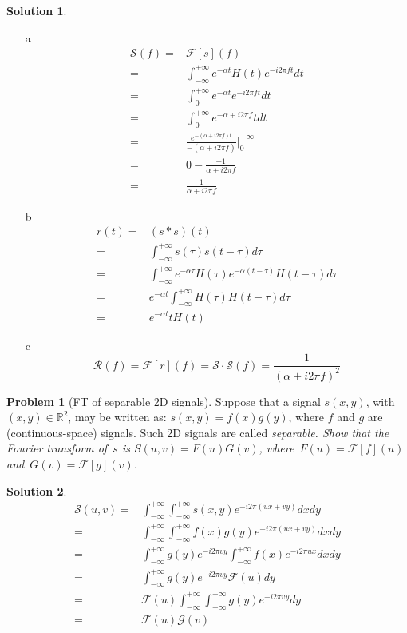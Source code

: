 \documentclass[11pt]{article}
\theoremstyle{plain}
\theoremstyle{definition}
\newtheorem{problem}{Problem}
\newtheorem{solution}{Solution}
\theoremstyle{remark}
\begin{document}
\begin{solution}
	\begin{enumerate}
		\item[a]
		\begin{eqnarray*}
			\mathcal{S}(f) = & \mathcal{F} [s] (f) \\
			=& \int_{-\infty}^{+\infty} e^{-\alpha t} H(t) e^{-i2\pi ft} dt\\
			=& \int_{0}^{+\infty} e^{-\alpha t} e^{-i2\pi ft} dt\\
			=& \int_{0}^{+\infty} e^{-\alpha + i2\pi f}t dt\\	
			=& \frac{e^{-(\alpha + i 2 \pi f)t}}{-(\alpha + i 2\pi f)} |_{0}^{+\infty}\\
			=& 0 - \frac{-1}{\alpha + i2\pi f}\\
			=& \frac{1}{\alpha + i 2\pi f}
		\end{eqnarray*}
		\item[b]
		\begin{eqnarray*}
			r(t) =& (s*s)(t) \\
			=& \int_{-\infty}^{+\infty} s(\tau) s(t-\tau) d\tau\\
			=& \int_{-\infty}^{+\infty} e^{-\alpha \tau} H(\tau) e^{-\alpha(t-\tau)} H(t-\tau) d\tau\\
			=& e^{-\alpha t} \int_{-\infty}^{+\infty} H(\tau) H(t-\tau) d\tau\\
			=& e^{-\alpha t} t H(t)
		\end{eqnarray*}
		\item[c]
		\begin{equation*}
			\mathcal{R}(f) = \mathcal{F}[r](f) = \mathcal{S}\cdot \mathcal{S}(f) = \frac{1}{(\alpha + i 2\pi f) ^2}
		\end{equation*}
	\end{enumerate}
\end{solution}
\begin{problem}[FT of separable 2D signals]
Suppose that a signal $s(x,y)$, with $(x,y)\in\mathbb{R}^2$,
may be written as: $s(x,y)=f(x)g(y)$, where $f$ 
and $g$ are (continuous-space) signals. 
Such 2D signals are called \em separable\em\/.
Show that the Fourier transform of~$s$ is %
$S(u,v)=F(u)G(v)$, where~$F(u)=\mathcal{F}[f](u)$
and~$G(v)=\mathcal{F}[g](v)$. 
\end{problem}
\begin{solution}
	\begin{eqnarray*}
		\mathcal{S}(u,v) =& \int_{-\infty}^{+\infty} \int_{-\infty}^{+\infty}  s(x,y) e^{-i 2\pi (ux +vy)} dx dy\\
		=& \int_{-\infty}^{+\infty} \int_{-\infty}^{+\infty} f(x) g(y) e^{-i 2\pi (ux +vy)} dx dy\\
		=& \int_{-\infty}^{+\infty} g(y) e^{-i2\pi vy} \int_{-\infty}^{+\infty}  f(x) e^{-i2\pi ux} dxdy\\
		=& \int_{-\infty}^{+\infty} g(y) e^{-i2\pi vy} \mathcal{F}(u) dy\\
		=& \mathcal{F}(u) \int_{-\infty}^{+\infty}  \int_{-\infty}^{+\infty} g(y) e^{-i2\pi vy} dy\\
		=& \mathcal{F}(u) \mathcal{G}(v)
	\end{eqnarray*}
\end{solution}
\end{document}
